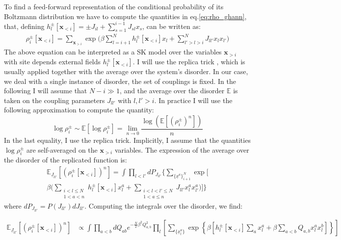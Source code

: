 \documentclass[aps,physrev,10pt,floatfix,reprint]{revtex4-2}
\begin{document}
To find a feed-forward representation of the conditional probability of its Boltzmann distribution we have to compute the quantities in eq.\ref{eq:rho_ghann}, that, defining $h_l^{\pm}[\mathbf{x}_{<i}] =\pm J_{il} + \sum_{s=1}^{i-1} J_{sl} x_s$, can be written as:
\begin{align*}
    \rho_i^{\pm} [\mathbf{x}_{<i}]  = \sum_{\mathbf{x}_{>i}}  \exp \bigg(
    \beta\sum_{l=i+1}^{N} h_l^{\pm}[\mathbf{x}_{<i}] x_l
    + \sum_{l'>l>i}^{N} J_{ll'} x_l x_{l'} \bigg)
\end{align*}
The above equation can be interpreted as a SK model over the variables $\mathbf{x}_{>i}$ with site depends external fields $h_l^{\pm}[\mathbf{x}_{<i}]$. 
I will use the replica trick \cite{10.1142/0271}, which is usually applied together with the average over the system's disorder. In our case, we deal with a single instance of disorder, the set of couplings is fixed. In the following I will assume that $N-i \gg 1$, and the average over the disorder $\mathbb{E}$ is taken on the coupling parameters $J_{ll'}$ with $l,l'>i$. In practice I will use the following approximation to compute the quantity:
\[
\log\rho_i^{\pm} \sim \mathbb{E}\left[  \log\rho_i^{\pm} \right] = \lim_{n\rightarrow 0} \frac{  \log(\mathbb{E}\left[(\rho_i^{\pm})^n \right])}{n}
\]
In the last equality, I use the replica trick. 
Implicitly, I assume that the quantities $\log\rho_i^{\pm}$ are self-averaged on the $\mathbf{x}_{>i}$ variables.
 The expression of the average over the disorder of the replicated function is:
\begin{multline}
\mathbb{E}_{\underline{J}_{ll'}}\left[(\rho_i^{\pm}[\mathbf{x}_{<i}])^n \right]  = 
\int \prod_{l<l'} dP_{J_{ll'}} \bigg\{ 
\sum_{\{\underline{x}^{a}\}_{i+1}^N} \exp\bigg[\\ \beta \bigg( 
\sum_{\substack{i<l \le N\\ 1<a<n}}h_l^{\pm}[\mathbf{x}_{<i}] x_l^{a} + 
\sum_{\substack{i < l< l' \le N\\ 1<a \le n}} J_{ll'} x_l^{a} x_{l'}^{a}
\bigg)  \bigg] 
\bigg\}
\end{multline}
where $dP_{J_{ll'}}=P(J_{ll'})dJ_{ll'}$.
Computing the integrals over the disorder, we find: 
\begin{widetext}
\begin{align}
\mathbb{E}_{\underline{J}_{ll'}}\left[(\rho_i^{\pm}[\mathbf{x}_{<i}])^n \right]
& \propto  \int \prod_{a<b} dQ_{ab} e^{-\frac{N}{2}\beta^2Q_{a,b}^2}
\prod_{l} \left[
\sum_{\{\underline{x}^{a}_l\}} 
\exp\left\{\beta \left[
h_l^{\pm}[\mathbf{x}_{<i}] \sum_{a} x_l^{a} +\beta \sum_{a<b} Q_{a,b}  x_l^{a} x_l^{b} \right]  \right\}
\right]
\end{align}
\end{widetext}
\end{document}
